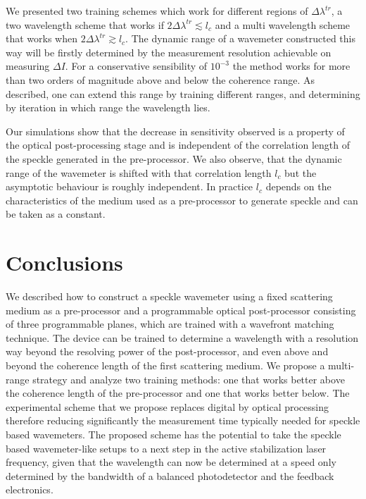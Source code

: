 \documentclass{optica-article}
\begin{document}
We presented two training schemes which work for different regions of $\Delta \lambda^{tr}$, a two wavelength scheme that works if $2 \Delta \lambda^{tr} \lesssim l_c $ and a multi wavelength scheme that works when $2 \Delta \lambda^{tr}\gtrsim l_c$. The dynamic range of a wavemeter constructed this way will be firstly determined by the measurement resolution achievable on measuring $\Delta I$. For a conservative sensibility of $10^{-3}$ the method works for more than two orders of magnitude above and below the coherence range. As described, one can extend this range by training different ranges, and determining by iteration  in which range the wavelength lies. 

Our simulations show that the decrease in sensitivity observed is a property of the optical post-processing stage and is independent of the correlation length of the speckle generated in the pre-processor. We also observe, that the dynamic range of the wavemeter is shifted with that correlation length $l_c$ but the asymptotic behaviour is roughly independent. In practice $l_c$ depends on the characteristics of the medium used as a pre-processor to generate speckle and can be taken as a constant.

\section{Conclusions}

We described how to construct a speckle wavemeter using a fixed scattering medium as a pre-processor and a programmable optical post-processor consisting of three programmable planes, which are trained with a wavefront matching technique. The device can be trained to determine a wavelength with a resolution way beyond the resolving power of the post-processor, and even above and beyond the coherence length of the first scattering medium. We propose a multi-range strategy and analyze two training methods: one that works better above the coherence length of the pre-processor and one that works better below. The experimental scheme that we propose replaces digital by optical processing therefore reducing significantly the measurement time typically needed for speckle based wavemeters. The proposed scheme has the potential to take the speckle based wavemeter-like setups to a next step in the active stabilization laser frequency, given that the wavelength can now be determined at a speed only determined by the bandwidth of a balanced photodetector and the feedback electronics.
\end{document}
